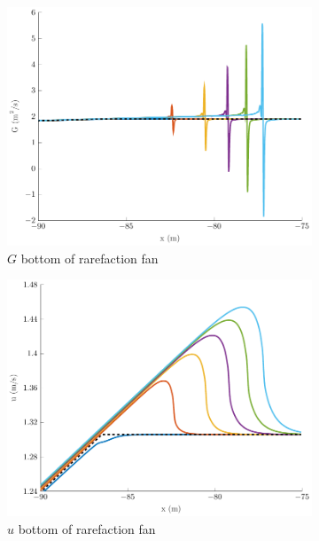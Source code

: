\documentclass[10pt]{elsarticle}
\begin{document}
\begin{figure}
\begin{subfigure}{0.32\textwidth}
		\centering
		\includegraphics[width=\textwidth]{./Figures/Simulations/Study/RegSWWE/Convergence/GRFBot.pdf}
		\caption{$G$ bottom of rarefaction fan}
	\end{subfigure}
	\begin{subfigure}{0.32\textwidth}
		\centering
		\includegraphics[width=\textwidth]{./Figures/Simulations/Study/RegSWWE/Convergence/uRFBot.pdf}
		\caption{$u$ bottom  of rarefaction fan}
	\end{subfigure}
	\begin{subfigure}{0.32\textwidth}
		\centering

\end{subfigure}
\end{figure}
\end{document}
